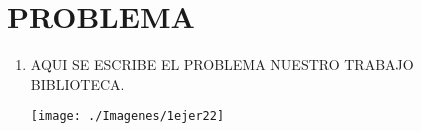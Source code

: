 \section{PROBLEMA} 

\begin{enumerate}[1.]
	\item AQUI SE ESCRIBE EL PROBLEMA NUESTRO TRABAJO BIBLIOTECA.
    


	\begin{center}
	\texttt{[image: ./Imagenes/1ejer22]} 
	\end{center}

\end{enumerate} 
